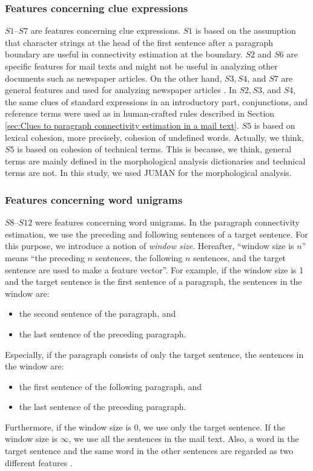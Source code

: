 \documentclass[english]{jnlp_1.4}
\begin{document}
\subsubsection{Features concerning clue expressions}

$S1$--$S7$ are features concerning clue expressions. 
$S1$ is based on the assumption that 
character strings at the head of the first sentence after a paragraph boundary
are useful in connectivity estimation at the boundary.
$S2$ and $S6$ are specific features for mail texts  
and might not be useful in analyzing other documents such as newspaper articles.
On the other hand, 
$S3, S4$, and  $S7$ are general features 
and used for analyzing newspaper articles \cite{proc:matsui2004}.
In $S2, S3$, and $S4$,  
the same clues of 
standard expressions in an introductory part, 
conjunctions, and 
reference terms 
were used as 
in human-crafted rules described 
in Section \ref{sec:Clues to paragraph connectivity estimation in a mail text}.
$S5$ is based on lexical cohesion, 
more precisely, 
cohesion of undefined words.
Actually, we think, 
$S5$ is based on cohesion of technical terms.
This is because,
we think, 
general terms are mainly defined in the morphological analysis dictionaries and 
technical terms are not.
In this study, 
we used JUMAN \cite{man:juman05} for the morphological analysis. 



\subsubsection{Features concerning word unigrams}

$S8$--$S12$ were features concerning word unigrams.
In the paragraph connectivity estimation, 
we use the preceding and following sentences of a target sentence.
For this purpose, 
we introduce a notion of \textit{window size}.
Hereafter, 
``window size is $n$'' means 
``the preceding $n$ sentences, the following $n$ sentences,  
and the target sentence are used to make a feature vector''.
For example, 
if the window size is 1 and 
the target sentence is the first sentence of a paragraph, 
the sentences in the window are:
\begin{itemize}
 \item the second sentence of the paragraph, and 

 \item the last sentence of the preceding paragraph.
\end{itemize}
Especially, 
if the paragraph consists of only the target sentence, 
the sentences in the window are:
\begin{itemize}
 \item the first sentence of the following paragraph, and 

 \item the last sentence of the preceding paragraph.
\end{itemize}
Furthermore, 
if the window size is 0, 
we use only the target sentence.
If the window size is $\infty$, 
we use all the sentences in the mail text.
Also, a word in the target sentence and the same word in the other
sentences are regarded as two different
features \cite{proc:tamura2005}.
\end{document}

